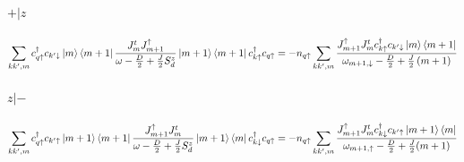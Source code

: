 \documentclass[12pt]{revtex4-2}
\begin{document}
\paragraph{\(+|z\)}
\begin{equation}\begin{aligned}
	\sum_{kk^\prime,m} c^\dagger_{q \uparrow}c_{k^\prime \downarrow} \ket{m}\bra{m+1}\frac{{J^t_m}J^\uparrow_{m+1}}{\omega - \frac{D}{2} + \frac{J}{2}S_d^z} \ket{m+1}\bra{m+1} c^\dagger_{k \uparrow} c_{q \uparrow} = -n_{q \uparrow}\sum_{kk^\prime,m}\frac{J^\uparrow_{m+1} J^t_m c^\dagger_{k \uparrow}c_{k^\prime\downarrow} \ket{m}\bra{m+1}}{\omega_{m+1, \downarrow} - \frac{D}{2} + \frac{J}{2}\left(m+1\right) }
\end{aligned}\end{equation}

\paragraph{\(z|-\)}
\begin{equation}\begin{aligned}
	\sum_{kk^\prime,m} c^\dagger_{q \uparrow} c_{k^\prime \uparrow} \ket{m+1}\bra{m+1}\frac{J^\uparrow_{m+1}{J^t_m}}{\omega - \frac{D}{2} + \frac{J}{2}S_d^z}\ket{m+1}\bra{m} c^\dagger_{k \downarrow}c_{q \uparrow} = -n_{q \uparrow}\sum_{kk^\prime,m}\frac{J^\uparrow_{m+1} J^t_m c^\dagger_{k \downarrow}c_{k^\prime\uparrow} \ket{m+1}\bra{m}}{\omega_{m+1, \uparrow} - \frac{D}{2} + \frac{J}{2}(m+1)}
\end{aligned}\end{equation}
\end{document}
